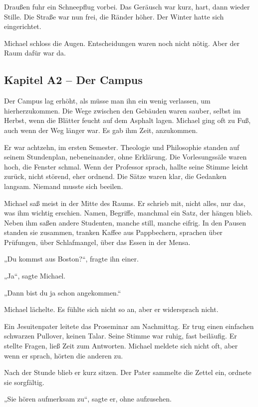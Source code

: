 \documentclass[
]{article}
\begin{document}
Draußen fuhr ein Schneepflug vorbei. Das Geräusch war kurz, hart, dann wieder Stille. Die Straße war nun frei, die Ränder höher. Der Winter hatte sich eingerichtet.

Michael schloss die Augen. Entscheidungen waren noch nicht nötig. Aber der Raum dafür war da.

\subsection{Kapitel A2 -- Der Campus}\label{kapitel-a2-der-campus}

Der Campus lag erhöht, als müsse man ihn ein wenig verlassen, um hierherzukommen. Die Wege zwischen den Gebäuden waren sauber, selbst im Herbst, wenn die Blätter feucht auf dem Asphalt lagen. Michael ging oft zu Fuß, auch wenn der Weg länger war. Es gab ihm Zeit, anzukommen.

Er war achtzehn, im ersten Semester. Theologie und Philosophie standen auf seinem Stundenplan, nebeneinander, ohne Erklärung. Die Vorlesungssäle waren hoch, die Fenster schmal. Wenn der Professor sprach, hallte seine Stimme leicht zurück, nicht störend, eher ordnend. Die Sätze waren klar, die Gedanken langsam. Niemand musste sich beeilen.

Michael saß meist in der Mitte des Raums. Er schrieb mit, nicht alles, nur das, was ihm wichtig erschien. Namen, Begriffe, manchmal ein Satz, der hängen blieb. Neben ihm saßen andere Studenten, manche still, manche eifrig. In den Pausen standen sie zusammen, tranken Kaffee aus Pappbechern, sprachen über Prüfungen, über Schlafmangel, über das Essen in der Mensa.

„Du kommst aus Boston?{\kern0pt}``, fragte ihn einer.

„Ja``, sagte Michael.

„Dann bist du ja schon angekommen.``

Michael lächelte. Es fühlte sich nicht so an, aber er widersprach nicht.

Ein Jesuitenpater leitete das Proseminar am Nachmittag. Er trug einen einfachen schwarzen Pullover, keinen Talar. Seine Stimme war ruhig, fast beiläufig. Er stellte Fragen, ließ Zeit zum Antworten. Michael meldete sich nicht oft, aber wenn er sprach, hörten die anderen zu.

Nach der Stunde blieb er kurz sitzen. Der Pater sammelte die Zettel ein, ordnete sie sorgfältig.

„Sie hören aufmerksam zu``, sagte er, ohne aufzusehen.
\end{document}
